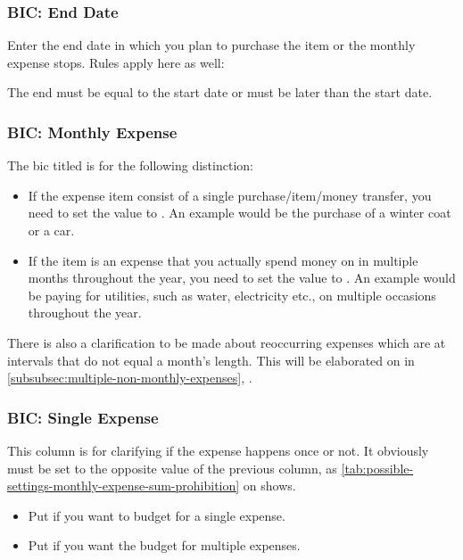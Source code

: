 \subsubsection{BIC: End Date}
\label{subsubsec:bic-end-date}

Enter the end date in which you plan to purchase the item or the monthly expense stops.
Rules apply here as well:
\begin{specialnote}
	The end must be equal to the start date or must be later than the start date.
\end{specialnote}

\subsubsection{BIC: Monthly Expense}
\label{subsubsec:bic-monthly-expense}

The \ac{bic} titled  is for the following distinction:
\begin{itemize}
	\item If the expense item consist of a single purchase/item/money transfer, you need to set the value to .
	An example would be the purchase of a winter coat or a car.
	\item If the item is an expense that you actually spend money on in multiple months throughout the year, you need to set the value to .
	An example would be paying for \eg utilities, such as water, electricity etc., on multiple occasions throughout the year.
\end{itemize}

There is also a clarification to be made about reoccurring expenses which are at intervals that do not equal a month's length.
This will be elaborated on in \autoref{subsubsec:multiple-non-monthly-expenses}, .

\subsubsection{BIC: Single Expense}
\label{subsubsec:bic-single-expense}

This column is for clarifying if the expense happens once or not.
It obviously must be set to the opposite value of the previous column, as \autoref{tab:possible-settings-monthly-expense-sum-prohibition} on  
shows.
\begin{itemize}
	\item Put  if you want to budget for a single expense.
	\item Put  if you want the budget for multiple expenses.
\end{itemize}

